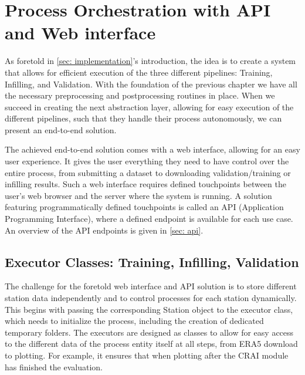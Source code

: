\section{Process Orchestration with API and Web interface}
\label{sec: process_orchestration}

As foretold in \autoref{sec: implementation}'s introduction, the idea is to create a system that allows for efficient execution of the three different pipelines: Training, Infilling, and Validation.
With the foundation of the previous chapter we have all the necessary preprocessing and postprocessing routines in place.
When we succeed in creating the next abstraction layer, allowing for easy execution of the different pipelines, such that they handle their process autonomously, we can present an end-to-end solution.

The achieved end-to-end solution comes with a web interface, allowing for an easy user experience.
It gives the user everything they need to have control over the entire process, from submitting a dataset to downloading validation/training or infilling results.
Such a web interface requires defined touchpoints between the user's web browser and the server where the system is running.
A solution featuring programmatically defined touchpoints is called an API (Application Programming Interface), where a defined endpoint is available for each use case.
An overview of the API endpoints is given in \autoref{sec: api}. 

\subsection{Executor Classes: Training, Infilling, Validation}

The challenge for the foretold web interface and API solution is to store different station data independently and to control processes for each station dynamically.
This begins with passing the corresponding Station object to the executor class, which needs to initialize the process, including the creation of dedicated temporary folders.
The executors are designed as classes to allow for easy access to the different data of the process entity itself at all steps, from ERA5 download to plotting. For example, it ensures that when plotting after the CRAI module has finished the evaluation.

